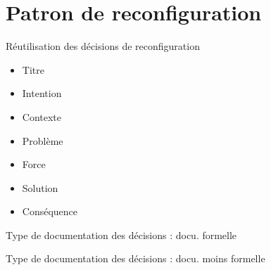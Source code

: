 \section{Patron de reconfiguration}

\begin{frame}{Réutilisation des décisions de reconfiguration}
\begin{itemize}
\item Titre                                                                    
\item Intention                                                                   
\item Contexte                                                                    
\item Problème                                                                    
\item Force                                                                     
\item Solution                                                                     
\item Conséquence                                                              
\end{itemize} 
\end{frame}


\begin{frame}{Type de documentation des décisions : docu. formelle}
\begin{table}[]
\end{table}
\end{frame}

\begin{frame}{Type de documentation des décisions : docu. moins
formelle}
\begin{table}[]
\end{table}
\end{frame}


